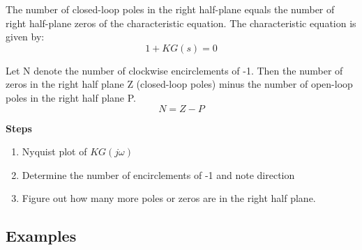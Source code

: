 The number of closed-loop poles in the right half-plane equals the number of right half-plane
zeros of the characteristic equation. The characteristic equation is given by:
$$1+KG(s) = 0$$

Let N denote the number of clockwise encirclements of -1. Then the number of zeros in
the right half plane Z (closed-loop poles) minus the number of open-loop poles in the right half plane P.
$$N = Z-P$$

\textbf{Steps}

\begin{enumerate}
	\item Nyquist plot of $KG(j\omega)$
	\item Determine the number of encirclements of -1 and note direction
	\item Figure out how many more poles or zeros are in the right half plane.
\end{enumerate}




\subsection{Examples}
